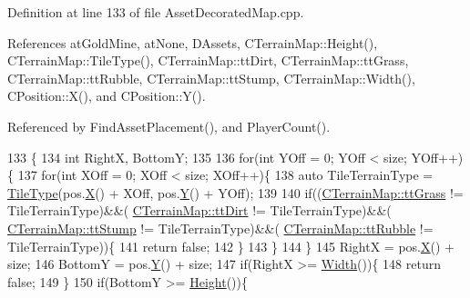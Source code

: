Definition at line 133 of file Asset\+Decorated\+Map.\+cpp.



References at\+Gold\+Mine, at\+None, D\+Assets, C\+Terrain\+Map\+::\+Height(), C\+Terrain\+Map\+::\+Tile\+Type(), C\+Terrain\+Map\+::tt\+Dirt, C\+Terrain\+Map\+::tt\+Grass, C\+Terrain\+Map\+::tt\+Rubble, C\+Terrain\+Map\+::tt\+Stump, C\+Terrain\+Map\+::\+Width(), C\+Position\+::\+X(), and C\+Position\+::\+Y().



Referenced by Find\+Asset\+Placement(), and Player\+Count().


\begin{DoxyCode}
133                                                                                                            
          \{
134     \textcolor{keywordtype}{int} RightX, BottomY;    
135 
136     \textcolor{keywordflow}{for}(\textcolor{keywordtype}{int} YOff = 0; YOff < size; YOff++)\{
137         \textcolor{keywordflow}{for}(\textcolor{keywordtype}{int} XOff = 0; XOff < size; XOff++)\{
138             \textcolor{keyword}{auto} TileTerrainType = \hyperlink{classCTerrainMap_a7e0e440467a09cb1c59e2bdbec01ccb4}{TileType}(pos.\hyperlink{classCPosition_a9a6b94d3b91df1492d166d9964c865fc}{X}() + XOff, pos.\hyperlink{classCPosition_a1aa8a30e2f08dda1f797736ba8c13a87}{Y}() + YOff);
139             
140             \textcolor{keywordflow}{if}((\hyperlink{classCTerrainMap_aff2ab991e237269941416dd79d8871d4ae587716ed26a437b6ea33f0ac823d47a}{CTerrainMap::ttGrass} != TileTerrainType)&&(
      \hyperlink{classCTerrainMap_aff2ab991e237269941416dd79d8871d4a49fb754039632e7127fca005dd95bab8}{CTerrainMap::ttDirt} != TileTerrainType)&&(
      \hyperlink{classCTerrainMap_aff2ab991e237269941416dd79d8871d4ac6008e344fb024b62741b2ffaef042ef}{CTerrainMap::ttStump} != TileTerrainType)&&(
      \hyperlink{classCTerrainMap_aff2ab991e237269941416dd79d8871d4a0969ea4c56acb3f5acf137c0d06a3371}{CTerrainMap::ttRubble} != TileTerrainType))\{
141                 \textcolor{keywordflow}{return} \textcolor{keyword}{false};
142             \}
143         \}
144     \}
145     RightX = pos.\hyperlink{classCPosition_a9a6b94d3b91df1492d166d9964c865fc}{X}() + size;
146     BottomY = pos.\hyperlink{classCPosition_a1aa8a30e2f08dda1f797736ba8c13a87}{Y}() + size;
147     \textcolor{keywordflow}{if}(RightX >= \hyperlink{classCTerrainMap_a34cb754aa9b26e85a73377159f2527d7}{Width}())\{
148         \textcolor{keywordflow}{return} \textcolor{keyword}{false};   
149     \}
150     \textcolor{keywordflow}{if}(BottomY >= \hyperlink{classCTerrainMap_ae5e4bf6507e0e3e9ac0322b43eed8a7a}{Height}())\{

\end{DoxyCode}
